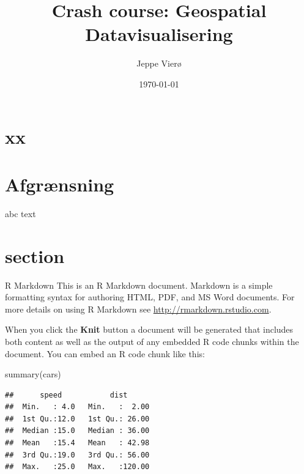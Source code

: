 \documentclass[
  8pt,
  ignorenonframetext,
  aspectratio=169]{beamer}
\title{Crash course: Geospatial Datavisualisering}
\author{Jeppe Vierø}
\date{\today}
\newenvironment{Shaded}{}{}
\newcommand{\FunctionTok}[1]{\textcolor[rgb]{0.02,0.16,0.49}{#1}}
\newcommand{\NormalTok}[1]{#1}
\begin{document}
\frame{\titlepage}

\begin{frame}[allowframebreaks]
  \tableofcontents[hideallsubsections]
\end{frame}
\hypertarget{xx}{%
\section{xx}\label{xx}}

\hypertarget{afgruxe6nsning}{%
\section{Afgrænsning}\label{afgruxe6nsning}}

\begin{frame}{abc}
\protect\hypertarget{abc}{}
text
\end{frame}

\hypertarget{section}{%
\section{section}\label{section}}

\begin{frame}[fragile]{R Markdown}
\protect\hypertarget{r-markdown}{}
This is an R Markdown document. Markdown is a simple formatting syntax
for authoring HTML, PDF, and MS Word documents. For more details on
using R Markdown see \url{http://rmarkdown.rstudio.com}.

When you click the \textbf{Knit} button a document will be generated
that includes both content as well as the output of any embedded R code
chunks within the document. You can embed an R code chunk like this:

\begin{Shaded}
\begin{Highlighting}[]
\FunctionTok{summary}\NormalTok{(cars)}
\end{Highlighting}
\end{Shaded}

\begin{verbatim}
##      speed           dist       
##  Min.   : 4.0   Min.   :  2.00  
##  1st Qu.:12.0   1st Qu.: 26.00  
##  Median :15.0   Median : 36.00  
##  Mean   :15.4   Mean   : 42.98  
##  3rd Qu.:19.0   3rd Qu.: 56.00  
##  Max.   :25.0   Max.   :120.00
\end{verbatim}
\end{frame}
\end{document}
